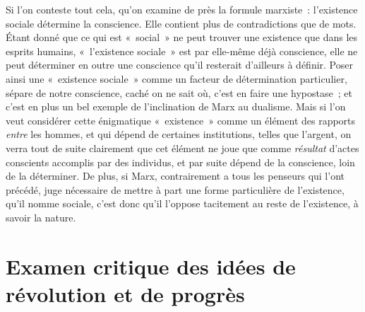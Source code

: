 \documentclass[french,twoside]{book} %
\begin{document}
Si l'on conteste tout cela, qu'on examine de près la formule marxiste : l'existence sociale détermine la conscience. Elle contient plus de contradictions que de mots. Étant donné que ce qui est « social » ne peut trouver une existence que dans les esprits humains, « l'existence sociale » est par elle-même déjà conscience, elle ne peut déterminer en outre une conscience qu'il resterait d'ailleurs à définir. Poser ainsi une « existence sociale » comme un facteur de détermination particulier, sépare de notre conscience, caché on ne sait où, c'est en faire une hypostase ; et c'est en plus un bel exemple de l'inclination de Marx au dualisme. Mais si l'on veut considérer cette énigmatique « existence » comme un élément des rapports {\itshape entre} les hommes, et qui dépend de certaines institutions, telles que l'argent, on verra tout de suite clairement que cet élément ne joue que comme {\itshape résultat} d'actes conscients accomplis par des individus, et par suite dépend de la conscience, loin de la déterminer. De plus, si Marx, contrairement a tous les penseurs qui l'ont précédé, juge nécessaire de mettre à part une forme particulière de l'existence, qu'il nomme sociale, c'est donc qu'il l'oppose tacitement au reste de l'existence, à savoir la nature.\par

\begin{center}
\noindent \centerline{}
\end{center}

\section[{Examen critique des idées de révolution et de progrès }]{Examen critique des idées de révolution et de progrès \protect\footnotemark }\renewcommand{\leftmark}{Examen critique des idées de révolution et de progrès }
\end{document}
